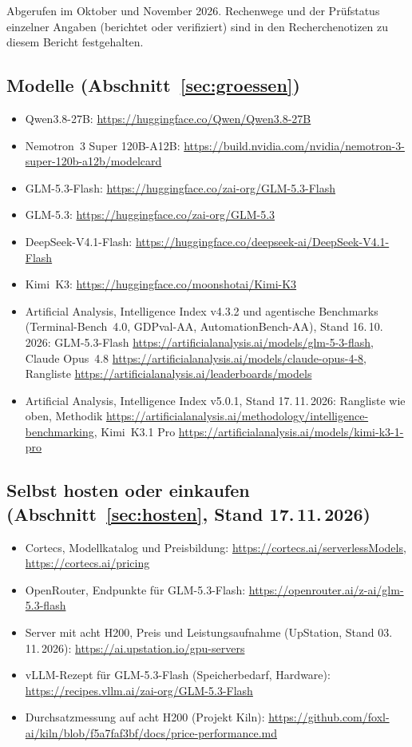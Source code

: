 \documentclass[a4paper,11pt]{article}
\begin{document}
Abgerufen im Oktober und November 2026. Rechenwege und der Prüfstatus
einzelner Angaben (berichtet oder verifiziert) sind in den
Recherchenotizen zu diesem Bericht festgehalten.

{\small
\subsection*{Modelle (Abschnitt~\ref{sec:groessen})}
\begin{itemize}[itemsep=0.1em]
  \item Qwen3.8-27B: \url{https://huggingface.co/Qwen/Qwen3.8-27B}
  \item Nemotron~3 Super 120B-A12B:
    \url{https://build.nvidia.com/nvidia/nemotron-3-super-120b-a12b/modelcard}
  \item GLM-5.3-Flash: \url{https://huggingface.co/zai-org/GLM-5.3-Flash}
  \item GLM-5.3: \url{https://huggingface.co/zai-org/GLM-5.3}
  \item DeepSeek-V4.1-Flash:
    \url{https://huggingface.co/deepseek-ai/DeepSeek-V4.1-Flash}
  \item Kimi~K3: \url{https://huggingface.co/moonshotai/Kimi-K3}
  \item Artificial Analysis, Intelligence Index v4.3.2 und agentische
    Benchmarks (Terminal-Bench~4.0, GDPval-AA, AutomationBench-AA),
    Stand 16.\,10.\,2026: GLM-5.3-Flash
    \url{https://artificialanalysis.ai/models/glm-5-3-flash}, Claude
    Opus~4.8 \url{https://artificialanalysis.ai/models/claude-opus-4-8},
    Rangliste \url{https://artificialanalysis.ai/leaderboards/models}
  \item Artificial Analysis, Intelligence Index v5.0.1, Stand
    17.\,11.\,2026: Rangliste wie oben, Methodik
    \url{https://artificialanalysis.ai/methodology/intelligence-benchmarking},
    Kimi~K3.1 Pro
    \url{https://artificialanalysis.ai/models/kimi-k3-1-pro}
\end{itemize}

\subsection*{Selbst hosten oder einkaufen (Abschnitt~\ref{sec:hosten}, Stand 17.\,11.\,2026)}
\begin{itemize}[itemsep=0.1em]
  \item Cortecs, Modellkatalog und Preisbildung:
    \url{https://cortecs.ai/serverlessModels},
    \url{https://cortecs.ai/pricing}
  \item OpenRouter, Endpunkte für GLM-5.3-Flash:
    \url{https://openrouter.ai/z-ai/glm-5.3-flash}
  \item Server mit acht H200, Preis und Leistungsaufnahme (UpStation,
    Stand 03.\,11.\,2026): \url{https://ai.upstation.io/gpu-servers}
  \item vLLM-Rezept für GLM-5.3-Flash (Speicherbedarf, Hardware):
    \url{https://recipes.vllm.ai/zai-org/GLM-5.3-Flash}
  \item Durchsatzmessung auf acht H200 (Projekt Kiln):
    \url{https://github.com/foxl-ai/kiln/blob/f5a7faf3bf/docs/price-performance.md}
\end{itemize}

}
\end{document}
